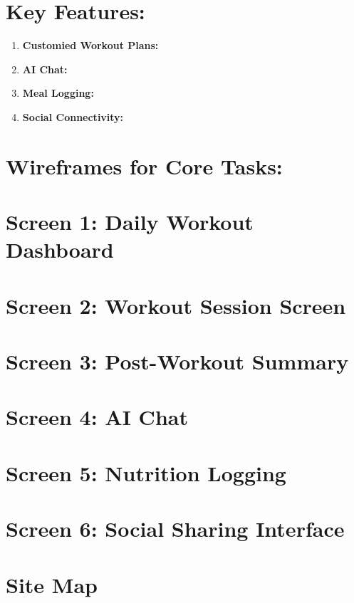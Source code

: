 \documentclass[letterpaper,11pt]{texMemo} %
\begin{document}
\section{Key Features:}

\begin{enumerate}
	
	\item \bf{Customied Workout Plans:}
		\item \bf{AI Chat:}
	\item \bf{Meal Logging:}
		\item \bf{Social Connectivity:}
\end{enumerate}


\section{Wireframes for Core Tasks:}

\section{Screen 1: Daily Workout Dashboard}
\section{Screen 2: Workout Session Screen}
\section{Screen 3: Post-Workout Summary}
\section{Screen 4: AI Chat}
\section{Screen 5: Nutrition Logging}
\section{Screen 6: Social Sharing Interface}
\section{Site Map}

\end{document}
